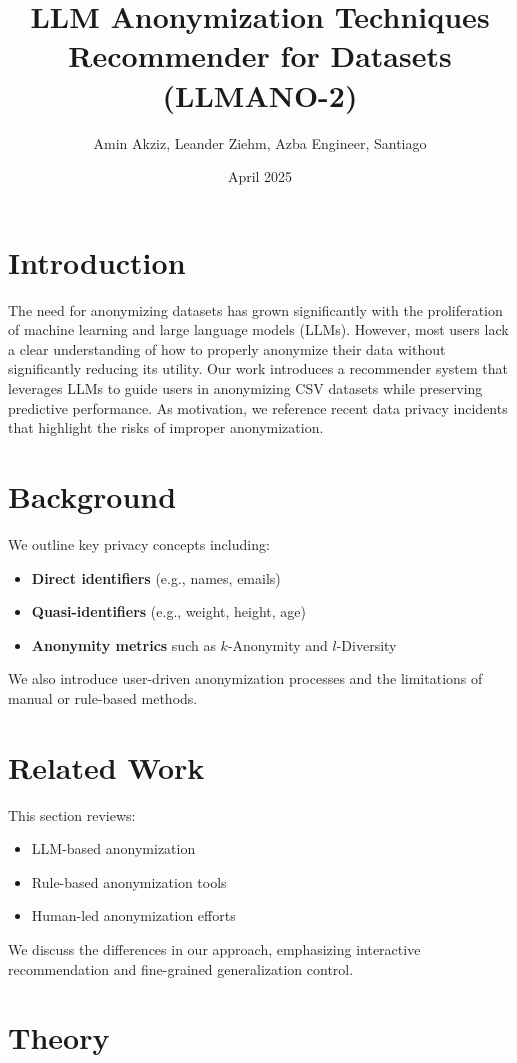 \documentclass{article}
\title{LLM Anonymization Techniques Recommender for Datasets (LLMANO-2)}
\author{Amin Akziz, Leander Ziehm, Azba Engineer, Santiago}
\date{April 2025}
\begin{document}
\maketitle

\section{Introduction}
The need for anonymizing datasets has grown significantly with the proliferation of machine learning and large language models (LLMs). However, most users lack a clear understanding of how to properly anonymize their data without significantly reducing its utility. Our work introduces a recommender system that leverages LLMs to guide users in anonymizing CSV datasets while preserving predictive performance. As motivation, we reference recent data privacy incidents that highlight the risks of improper anonymization.

\section{Background}
We outline key privacy concepts including:
\begin{itemize}
    \item \textbf{Direct identifiers} (e.g., names, emails)
    \item \textbf{Quasi-identifiers} (e.g., weight, height, age)
    \item \textbf{Anonymity metrics} such as $k$-Anonymity and $l$-Diversity
\end{itemize}
We also introduce user-driven anonymization processes and the limitations of manual or rule-based methods.

\section{Related Work}
This section reviews:
\begin{itemize}
    \item LLM-based anonymization
    \item Rule-based anonymization tools
    \item Human-led anonymization efforts
\end{itemize}
We discuss the differences in our approach, emphasizing interactive recommendation and fine-grained generalization control.

\section{Theory}
\end{document}
